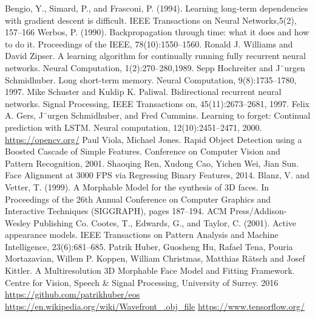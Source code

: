 \documentclass[a4paper, openany, oneside, 11pt]{book}
\begin{document}
\begin{thebibliography}{99}
Bengio, Y., Simard, P., and Frasconi, P. (1994). Learning long-term dependencies with gradient descent is
difficult. IEEE Transactions on Neural Networks,5(2), 157–166
Werbos, P. (1990). Backpropagation through time: what it does and how to do it. Proceedings of the
IEEE, 78(10):1550–1560.
Ronald J. Williams and David Zipser. A learning algorithm for continually running fully recurrent neural networks. Neural Computation, 1(2):270–280,1989.
Sepp Hochreiter and J¨urgen Schmidhuber. Long short-term memory. Neural Computation, 9(8):1735–1780, 1997.
Mike Schuster and Kuldip K. Paliwal. Bidirectional recurrent neural networks.
Signal Processing, IEEE Transactions on, 45(11):2673–2681, 1997.
Felix A. Gers, J¨urgen Schmidhuber, and Fred Cummins. Learning to forget:
Continual prediction with LSTM. Neural computation, 12(10):2451–2471,
2000.
\url{https://opencv.org/}
Paul Viola, Michael Jones. Rapid Object Detection using a Boosted Cascade of Simple Features. Conference on Computer Vision and Pattern Recognition, 2001.
Shaoqing Ren, Xudong Cao, Yichen Wei, Jian Sun. Face Alignment at 3000 FPS via Regressing Binary Features, 2014.
Blanz, V. and Vetter, T. (1999). A Morphable Model for the
synthesis of 3D faces. In Proceedings of the 26th Annual Conference on Computer Graphics and Interactive Techniques (SIGGRAPH), pages 187–194. ACM
Press/Addison-Wesley Publishing Co.
Cootes, T., Edwards, G., and Taylor, C. (2001). Active appearance models. IEEE Transactions on Pattern Analysis and Machine Intelligence, 23(6):681–685.
Patrik Huber, Guosheng Hu, Rafael Tena, Pouria Mortazavian, Willem P. Koppen, William Christmas, Matthias R{\"a}tsch and Josef Kittler. A Multiresolution 3D Morphable Face Model and Fitting Framework. Centre for Vision, Speech \& Signal Processing, University of Surrey. 2016
\url{https://github.com/patrikhuber/eos}
\url{https://en.wikipedia.org/wiki/Wavefront_.obj_file}
\url{https://www.tensorflow.org/}
\end{thebibliography}

\newpage
\listoffigures
\listoftables

\newpage
{}
\printglossary[title=Spisak skrac1enica, type=\acronymtype]
\end{document}
